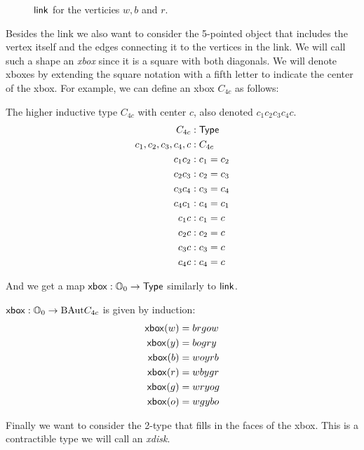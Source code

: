 \begin{figure}[h]
\centering

\caption{\( \mathsf{link} \) for the verticies \( w, b\) and \( r \).}
\label{fig:triangle_of_equators}
\end{figure}

Besides the link we also want to consider the 5-pointed object that includes the vertex itself and the edges connecting it to the vertices in the link. We will call such a shape an \emph{xbox} since it is a square with both diagonals. We will denote xboxes by extending the square notation with a fifth letter to indicate the center of the xbox. For example, we can define an xbox \( C_{4c} \) as follows:

\begin{mydef}
The higher inductive type \( C_{4c} \) with center \( c \), also denoted \( c_1c_2c_3c_4c \).
\begin{align*}
C_{4c} &: \mathsf{Type} \\
c_1, c_2, c_3, c_4, c &: C_{4c} \\
c_1c_2 &: c_1 = c_2 \\
c_2c_3 &: c_2 = c_3 \\
c_3c_4 &: c_3 = c_4 \\
c_4c_1 &: c_4 = c_1 \\
c_1c &: c_1 = c \\
c_2c &: c_2 = c \\
c_3c &: c_3 = c \\
c_4c &: c_4 = c 
\end{align*}
\end{mydef}

And we get a map \( \mathsf{xbox}:\mathbb{O}_0\to\mathsf{Type} \) similarly to \( \mathsf{link} \).
\begin{mydef}
\( \mathsf{xbox}:\mathbb{O}_0\to\mathrm{BAut} C_{4c} \) is given by induction:
\begin{align*}
\mathsf{xbox}(w) &= brgow \\
\mathsf{xbox}(y) &= bogry \\
\mathsf{xbox}(b) &= woyrb \\
\mathsf{xbox}(r) &= wbygr \\
\mathsf{xbox}(g) &= wryog \\
\mathsf{xbox}(o) &= wgybo
\end{align*}
\end{mydef}

Finally we want to consider the 2-type that fills in the faces of the xbox. This is a contractible type we will call an \emph{xdisk}. 

